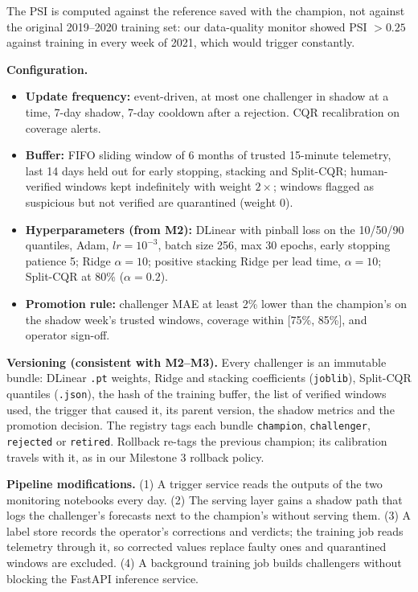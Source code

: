 \documentclass[11pt,letterpaper]{article}
\begin{document}
The PSI is computed against the reference saved with the champion, not against the original 2019--2020 training set:
our data-quality monitor showed PSI $>0.25$ against training in every week of 2021, which would trigger constantly.

\textbf{Configuration.}
\begin{itemize}
  \item \textbf{Update frequency:} event-driven, at most one challenger in shadow at a time, 7-day shadow, 7-day
  cooldown after a rejection. CQR recalibration on coverage alerts.
  \item \textbf{Buffer:} FIFO sliding window of 6 months of trusted 15-minute telemetry, last 14 days held out for
  early stopping, stacking and Split-CQR; human-verified windows kept indefinitely with weight $2\times$; windows
  flagged as suspicious but not verified are quarantined (weight 0).
  \item \textbf{Hyperparameters (from M2):} DLinear with pinball loss on the 10/50/90 quantiles, Adam,
  $lr=10^{-3}$, batch size 256, max 30 epochs, early stopping patience 5; Ridge $\alpha=10$; positive stacking Ridge
  per lead time, $\alpha=10$; Split-CQR at 80\% ($\alpha=0.2$).
  \item \textbf{Promotion rule:} challenger MAE at least 2\% lower than the champion's on the shadow week's trusted
  windows, coverage within [75\%, 85\%], and operator sign-off.
\end{itemize}

\textbf{Versioning (consistent with M2--M3).} Every challenger is an immutable bundle: DLinear \texttt{.pt} weights,
Ridge and stacking coefficients (\texttt{joblib}), Split-CQR quantiles (\texttt{.json}), the hash of the training
buffer, the list of verified windows used, the trigger that caused it, its parent version, the shadow metrics and the
promotion decision. The registry tags each bundle \texttt{champion}, \texttt{challenger}, \texttt{rejected} or
\texttt{retired}. Rollback re-tags the previous champion; its calibration travels with it, as in our Milestone 3
rollback policy.

\textbf{Pipeline modifications.}
(1) A trigger service reads the outputs of the two monitoring notebooks every day.
(2) The serving layer gains a shadow path that logs the challenger's forecasts next to the champion's without serving
them.
(3) A label store records the operator's corrections and verdicts; the training job reads telemetry through it, so
corrected values replace faulty ones and quarantined windows are excluded.
(4) A background training job builds challengers without blocking the FastAPI inference service.
\end{document}
